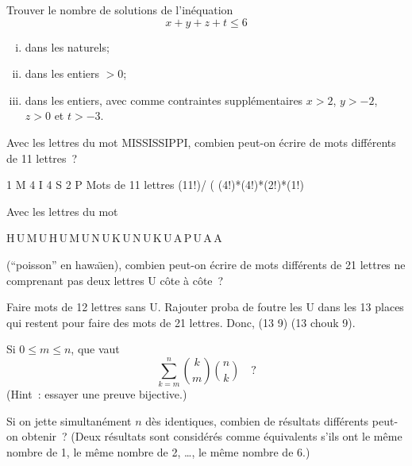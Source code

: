 
\begin{exo} 
Trouver le nombre de solutions de l'in\'equation
$$
x + y + z + t \leqslant 6
$$
%
\begin{enumerate}[(i)]
\item dans les naturels;
\item dans les entiers $>0$;
\item dans les entiers, avec comme contraintes suppl\'ementaires $x > 2$, $y > -2$, $z > 0$ et $t > -3$.
\end{enumerate}
\end{exo}


\begin{exo} 
Avec les lettres du mot MISSISSIPPI, combien peut-on \'ecrire de mots diff\'erents de 11 lettres~?
\end{exo}

1 M 4 I 4 S 2 P
	Mots de 11 lettres
		(11!)/ ( (4!)*(4!)*(2!)*(1!)



\begin{exo} 
Avec les lettres du mot 
%
\begin{center}
H\,U\,M\,U\,H\,U\,M\,U\,N\,U\,K\,U\,N\,U\,K\,U\,A\,P\,U\,A\,A
\end{center}
(``poisson'' en hawa\"\i{}en), combien peut-on \'ecrire de mots diff\'erents de 21 lettres ne comprenant pas deux lettres U c\^ote \`a c\^ote~?
\end{exo}

Faire mots de 12 lettres sans U. Rajouter proba de foutre les U dans les 13 places qui restent pour faire des mots de 21 lettres. Donc, (13 9) (13 chouk 9).


\begin{exo} 
Si $0 \leqslant m \leqslant n$, que vaut
$$
\sum_{k=m}^n {k \choose m}{n \choose k}\quad ?
$$
(Hint~: essayer une preuve bijective.)
\end{exo}


\begin{exo} 
Si on jette simultan\'ement $n$ d\`es identiques, combien de r\'esultats diff\'erents peut-on obtenir~? (Deux r\'esultats sont consid\'er\'es comme \'equivalents s'ils ont le m\^eme nombre de 1, le m\^eme nombre de 2, \ldots, le m\^eme nombre de 6.)
\end{exo}